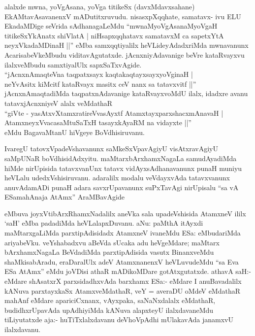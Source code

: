 \begin{artha}
alalxde mwna, yoVgAsana, yoVga titikeSx (davxMdavxsahane) EkAMtavAsavanenxV mADutitxruvudu. nisasxpXqqhate, samatavx- ivu ELU EkadaMDige seVrida sAdhanagaLeMdu ``mwnaMyoVgAsanaMyoVgaH titikeSxYkAnatx shiVlatA | niHsapxqqhatavx samatavxM ca sapetxYtA neyxVkadaMDinaH ||'' eMba samxqqtiyalilx heVLideyAdadxriMda mwnavanunx AcarisabeVkeMbudu viditavAgutatxde. jAcnxniyAdavanige beVre kataRvayxvu ilalxveMbudu samxtiyalUlx sapxSaTxvAgide. \\``jAcnxnAmaqteVna taqpatxsayx kaqtakaqtayxsayxyoVginaH |\\
neYvAsitx kiMcitf kataRvayx masitx ceV nanx sa tatavxvitf ||''\\ jAcnxnAmaqtadiMda taqpatxnAdavanige kataRvayxvoMdU ilalx, idadxre avanu tatavxjAcnxniyeV alalx veMdathaR \\``giVte - yasAtxvXtamxratireVvasAyxtf AtamxtayxparxshacxmAnavaH |\\
AtamxneyxVvacasaMtuSaTxH tasayxkAyaRM na vidayxte ||''\\ eMdu BagavaMtanU hiVgeye BoVdhisiruvanu.
\end{artha}

\begin{artha}
IvaregU tatovxVpadeVshavanunx saMkeSxVpavAgiyU visAtxravAgiyU saMpUNaR boVdhisidAdxyitu. maMtarxbArxhamxNagaLa samudAyadiMda hiMde nirUpisida tatavxvanUnx tatavx vidAyxsAdhanavanunx punaH muniyu heVLalu udedxVshisiruvanu. adaralilx modalu veVdayxvAda tatavxvanunx anuvAdamADi punaH adara savxrUpavanunx suPxTavAgi nirUpisalu ``sa vA ESamahAnaja AtAmx'' AraMBavAgide
\end{artha}


\begin{artha}
eMbuva joyxVtibArxRhamxNadalilx aneVka sala upadeVshisida AtamxneV ililx `saH' eMba padadiMda heVLalapxDuvanu. aNu: paMthA itAyxdi maMtarxgaLiMda parxtipAdisidadx AtamxneV ivaneMdu ESa: eMbudariMda ariyabeVku. veYshabadxvu aBeVda sUcaka adu heVgeMdare; maMtarx bArxhamxNagaLa BeVdadiMda parxtipAdisida vasutx BinanxveMdu shaMkisabAradu, eraDaralUlx adeV AtamxnanenxV heVLuvudeMdu ``sa Eva ESa AtAmx'' eMdu joVDisi athaR mADikoMDare gotAtxgutatxde. athavA saH:- eMdare shAsatxrX parxsidadhxvAda barxhamx ESa:- eMdare I anuBavadalilx kANuva parxtayxkaSx AtamxveMdathaR, veY =  averaDU oMdeV eMdathaR mahAnf eMdare apariciCxnanx, vAyxpaka, saNaNxdalalx eMdathaR, budidhxrUpavAda upAdhiyiMda kANuva alapxteyU ilalxdavaneMdu tiLiyutatxde aja:- huTiTxlalxdavanu deVhoVpAdhi mUlakavAda janamxvU ilalxdavanu.
\end{artha}

